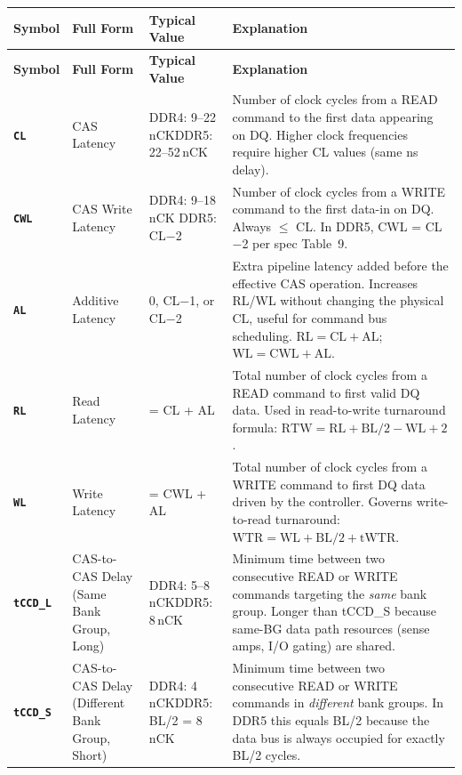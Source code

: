 \documentclass[11pt,a4paper]{article}
\newcommand{\sym}[1]{\texttt{\textbf{#1}}}
\begin{document}
\begin{longtable}{L{2.2cm} L{4.8cm} L{3.5cm} L{4cm}}
\toprule
\textbf{Symbol} & \textbf{Full Form} & \textbf{Typical Value} & \textbf{Explanation} \\
\midrule
\endfirsthead
\toprule
\textbf{Symbol} & \textbf{Full Form} & \textbf{Typical Value} & \textbf{Explanation} \\
\midrule
\endhead
\bottomrule
\endfoot

\sym{CL} & CAS Latency & DDR4: 9--22\,nCK\newline DDR5: 22--52\,nCK &
  Number of clock cycles from a READ command to the first data appearing on DQ.
  Higher clock frequencies require higher CL values (same ns delay). \\

\sym{CWL} & CAS Write Latency & DDR4: 9--18\,nCK \newline DDR5: CL$-$2 &
  Number of clock cycles from a WRITE command to the first data-in on DQ.
  Always $\leq$ CL. In DDR5, CWL = CL$-$2 per spec Table~9. \\

\sym{AL} & Additive Latency & 0, CL$-$1, or CL$-$2 &
  Extra pipeline latency added before the effective CAS operation.
  Increases RL/WL without changing the physical CL, useful for command bus scheduling.
  $\text{RL} = \text{CL} + \text{AL}$;\ $\text{WL} = \text{CWL} + \text{AL}$. \\

\sym{RL} & Read Latency & = CL + AL &
  Total number of clock cycles from a READ command to first valid DQ data.
  Used in read-to-write turnaround formula: $\text{RTW} = \text{RL} + \text{BL/2} - \text{WL} + 2$. \\

\sym{WL} & Write Latency & = CWL + AL &
  Total number of clock cycles from a WRITE command to first DQ data driven by the controller.
  Governs write-to-read turnaround: $\text{WTR} = \text{WL} + \text{BL/2} + \text{tWTR}$. \\

\sym{tCCD\_L} & CAS-to-CAS Delay (Same Bank Group, Long) & DDR4: 5--8\,nCK\newline DDR5: 8\,nCK &
  Minimum time between two consecutive READ or WRITE commands targeting the \textit{same} bank group.
  Longer than tCCD\_S because same-BG data path resources (sense amps, I/O gating) are shared. \\

\sym{tCCD\_S} & CAS-to-CAS Delay (Different Bank Group, Short) & DDR4: 4\,nCK\newline DDR5: BL/2 = 8\,nCK &
  Minimum time between two consecutive READ or WRITE commands in \textit{different} bank groups.
  In DDR5 this equals BL/2 because the data bus is always occupied for exactly BL/2 cycles. \\


\end{longtable}
\end{document}

